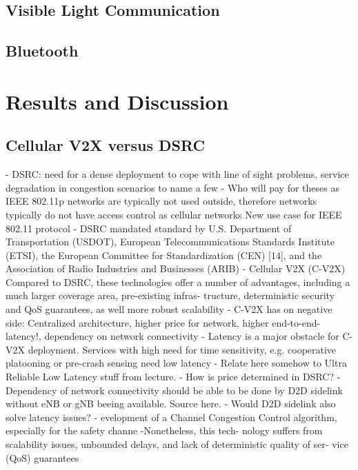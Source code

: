 \documentclass[conference,12pt,onecolumn]{IEEEtran}
\begin{document}
\subsection{Visible Light Communication}
\subsection{Bluetooth}

\section{Results and Discussion}
\subsection{Cellular V2X versus DSRC}
- DSRC: need for a dense deployment to cope with line of sight problems, service degradation in congestion scenarios to name a few \cite{machardy2018}
- Who will pay for theses as IEEE 802.11p networks are typically not used outside, therefore networks typically do not have access control as cellular networks \cite{machardy2018} New use case for IEEE 802.11 protocol
- DSRC mandated standard by U.S. Department of Transportation (USDOT), European Telecommunications Standards Institute (ETSI), the European Committee for Standardization (CEN) [14], and the Association of Radio Industries and Businesses (ARIB) \cite{machardy2018}
- Cellular V2X (C-V2X) Compared to DSRC, these technologies offer a number of advantages, including a much larger coverage area, pre-existing infras- tructure, deterministic security and QoS guarantees, as well more robust scalability \cite{machardy2018}
- C-V2X has on negative side: Centralized architecture, higher price for network, higher end-to-end-latency!, dependency on network connectivity \cite{machardy2018}
- Latency is a major obstacle for C-V2X deployment. Services with high need for time sensitivity, e.g. cooperative platooning or pre-crash sensing need low latency \cite{machardy2018}
- Relate here somehow to Ultra Reliable Low Latency stuff from lecture.
- How is price determined in DSRC?
- Dependency of network connectivity should be able to be done by D2D sidelink without eNB or gNB beeing available. Source here.
- Would D2D sidelink also solve latency issues?
- evelopment of a Channel Congestion Control
algorithm, especially for the safety channe \cite{kenney2011}
-Nonetheless, this tech- nology suffers from scalability issues, unbounded delays, and lack of deterministic quality of ser- vice (QoS) guarantees \cite{araniti2013}
\end{document}
